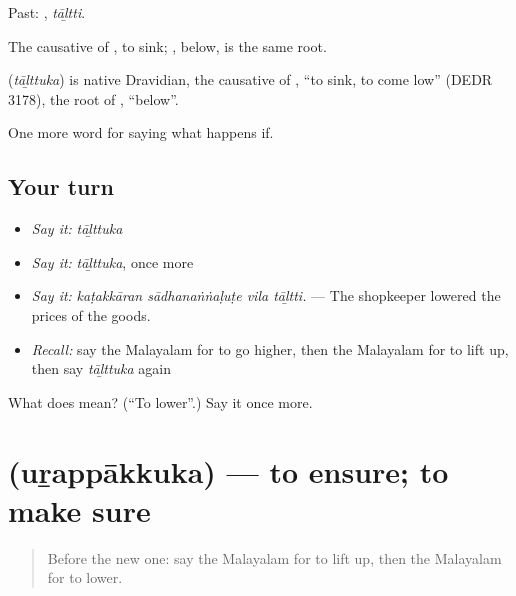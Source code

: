 Past: , \emph{tāḻtti}.

The causative of , to sink; , below, is the same root.

\begin{cousinweb}
\textbf{} (\emph{tāḻttuka}) is native Dravidian, the causative of , \textquotedblleft{}to sink, to come low\textquotedblright{} (DEDR 3178), the root of , \textquotedblleft{}below\textquotedblright{}.
\end{cousinweb}

\begin{grammarlens}[title={What you've built}]
One more word for saying what happens if.
\end{grammarlens}

\subsection*{Your turn}
\begin{itemize}
\raggedright
  \item \emph{Say it:} \emph{tāḻttuka}
  \item \emph{Say it:} \emph{tāḻttuka}, once more
  \item \emph{Say it:} \emph{kaṭakkāran sādhanaṅṅaḷuṭe vila tāḻtti.} — The shopkeeper lowered the prices of the goods.
  \item \emph{Recall:} say the Malayalam for to go higher, then the Malayalam for to lift up, then say \emph{tāḻttuka} again
\end{itemize}

\begin{tcolorbox}[breakable,colback=teal!4,colframe=teal!35!black,title={Before you move on}]
What does  mean? (\textquotedblleft{}To lower\textquotedblright{}.) Say it once more.
\end{tcolorbox}
\section[\texorpdfstring{\ml{ഉറപ്പാക്കുക} (uṟappākkuka)}{ഉറപ്പാക്കുക (uṟappākkuka)}]{ (uṟappākkuka) — to ensure; to make sure}

\label{lesson:ML-C450-urappakkuka}



\begin{quote}
Before the new one: say the Malayalam for to lift up, then the Malayalam for to lower.
\end{quote}

